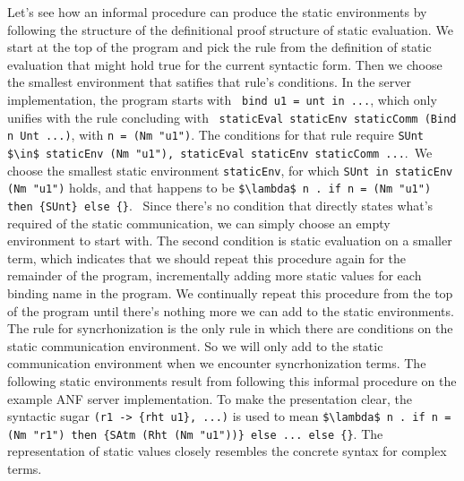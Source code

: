 \documentclass[letterpaper, 11pt]{extarticle}
\begin{document}
Let's see how an informal procedure can produce the static environments by following the
structure of the definitional proof structure of static evaluation.
We start at the top of the program and pick the 
rule from the definition of static evaluation that might hold true for the current syntactic form.
Then we choose the smallest environment that satifies that rule's conditions. 
In the server implementation, the program starts with \
\lstinline[language=normal_lang, mathescape]{bind u1 = unt in ...}, which only unifies with 
the rule concluding with \
\lstinline[language=logic, mathescape]{staticEval staticEnv staticComm (Bind n Unt ...)},
with \lstinline[language=logic, mathescape]{n = (Nm "u1")}. 
The conditions for that rule require 
\lstinline[language=logic, mathescape]{SUnt $\in$ staticEnv (Nm "u1"), staticEval staticEnv staticComm ...}.\
We choose the smallest static environment \lstinline{staticEnv}, for which
\lstinline[language=logic]{SUnt in staticEnv (Nm "u1")} holds, and that happens to be 
\lstinline[language=logic]|$\lambda$ n . if n = (Nm "u1") then {SUnt} else {}|. \
Since there's no condition that directly states what's required of the static communication, we can
simply choose an empty environment to start with. The second condition is static evaluation on
a smaller term, which indicates that we should repeat this procedure again for the remainder of
the program, incrementally adding more static values for each binding name in the program.
We continually repeat this procedure from the top of the program until there's
nothing more we can add to the static environments.
The rule for syncrhonization is the only rule in which there are conditions on
the static communication environment. So we will only add to the static communication
environment when we encounter syncrhonization terms.
The following static environments result from following this informal procedure on
the example ANF server implementation.
To make the presentation clear, the syntactic sugar \lstinline|(r1 -> {rht u1}, ...)| is used 
to mean \lstinline[language=logic]|$\lambda$ n . if n = (Nm "r1") then {SAtm (Rht (Nm "u1"))} else ... else {}|.
The representation of static values closely resembles the concrete syntax for complex terms.
\end{document}
